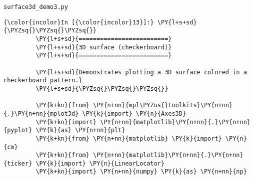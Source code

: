     
    \texttt{surface3d\_demo3.py}

    \begin{Verbatim}[commandchars=\\\{\},frame=single,framerule=0.3mm,rulecolor=\color{cellframecolor}]
{\color{incolor}In [{\color{incolor}13}]:} \PY{l+s+sd}{\PYZsq{}\PYZsq{}\PYZsq{}}
         \PY{l+s+sd}{=========================}
         \PY{l+s+sd}{3D surface (checkerboard)}
         \PY{l+s+sd}{=========================}
         
         \PY{l+s+sd}{Demonstrates plotting a 3D surface colored in a checkerboard pattern.}
         \PY{l+s+sd}{\PYZsq{}\PYZsq{}\PYZsq{}}
         
         \PY{k+kn}{from} \PY{n+nn}{mpl\PYZus{}toolkits}\PY{n+nn}{.}\PY{n+nn}{mplot3d} \PY{k}{import} \PY{n}{Axes3D}
         \PY{k+kn}{import} \PY{n+nn}{matplotlib}\PY{n+nn}{.}\PY{n+nn}{pyplot} \PY{k}{as} \PY{n+nn}{plt}
         \PY{k+kn}{from} \PY{n+nn}{matplotlib} \PY{k}{import} \PY{n}{cm}
         \PY{k+kn}{from} \PY{n+nn}{matplotlib}\PY{n+nn}{.}\PY{n+nn}{ticker} \PY{k}{import} \PY{n}{LinearLocator}
         \PY{k+kn}{import} \PY{n+nn}{numpy} \PY{k}{as} \PY{n+nn}{np}
\end{Verbatim}


